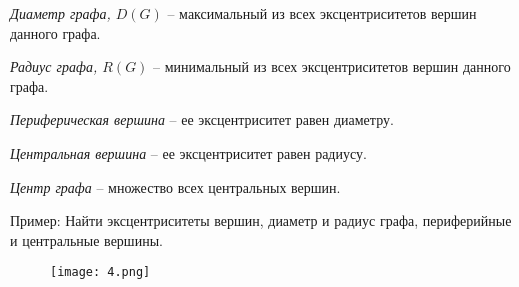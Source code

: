 \begin{definition}
    \textit{Диаметр графа, $D(G)$} -- максимальный из всех эксцентриситетов
    вершин данного графа.
\end{definition}

\begin{definition}
    \textit{Радиус графа, $R(G)$} -- минимальный из всех эксцентриситетов
    вершин данного графа.
\end{definition}

\begin{definition}
    \textit{Периферическая вершина} -- ее эксцентриситет равен диаметру.
\end{definition}

\begin{definition}
    \textit{Центральная вершина} -- ее эксцентриситет равен радиусу.
\end{definition}

\begin{definition}
    \textit{Центр графа} -- множество всех центральных вершин.
\end{definition}

Пример: Найти эксцентриситеты вершин, диаметр и радиус графа,
периферийные и центральные вершины.

\begin{figure}[h]
    \centering
    \texttt{[image: 4.png]}
\end{figure}